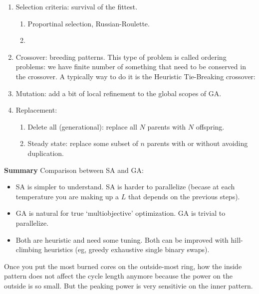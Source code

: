 \documentclass{school-22.211-notes}
\begin{document}
\begin{enumerate}
\item  Selection criteria: survival of the fittest. 
  \begin{enumerate}
  \item Proportinal selection, Russian-Roulette. 
  \item 
  \end{enumerate}

\item Crossover: breeding patterns. This type of problem is called ordering problems: we have finite number of something that need to be conserved in the crossover. A typically way to do it is the Heuristic Tie-Breaking crossover: 

\item Mutation: add a bit of local refinement to the global scopes of GA. 

\item Replacement: 
  \begin{enumerate}
    \item Delete all (generational): replace all $N$ parents with $N$ offspring.    \item Steady state: replace some subset of $n$ parents with or without avoiding duplication.
  \end{enumerate}
\end{enumerate}



\textbf{Summary}
Comparison between SA and GA:
\begin{itemize}
\item SA is simpler to understand. SA is harder to parallelize (becase at each temperature you are making up a $L$ that depends on the previous steps). 
\item GA is natural for true `multiobjective' optimization. GA is trivial to parallelize. 
\item Both are heuristic and need some tuning. Both can be improved with hill-climbing heuristics (eg, greedy exhaustive single binary swaps). 
\end{itemize}
Once you put the most burned cores on the outside-most ring, how the inside pattern does not affect the cycle length anymore because the power on the outside is so small. But the peaking power is very sensitivie on the inner pattern. 
\end{document}
